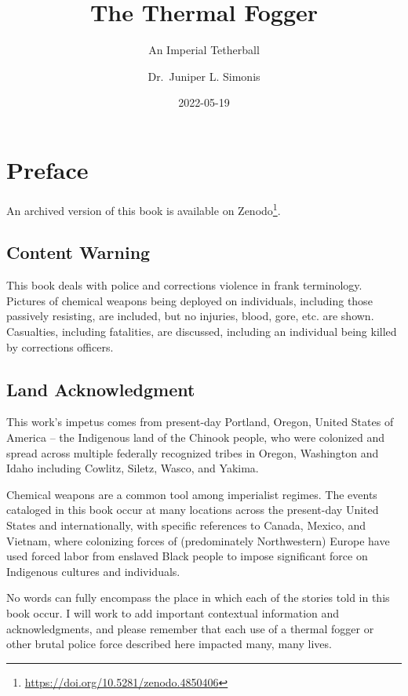 \documentclass[
  11pt,
]{krantz}
\title{The Thermal Fogger}
\subtitle{An Imperial Tetherball}
\author{Dr.~Juniper L. Simonis}
\date{2022-05-19}
\renewcommand{\href}[2]{#2\footnote{\url{#1}}}
\begin{document}
\maketitle



{
\hypersetup{linkcolor=}
\setcounter{tocdepth}{2}
\tableofcontents
}
\listoffigures
\hypertarget{preface}{%
\chapter*{Preface}\label{preface}}


\href{https://doi.org/10.5281/zenodo.4850406}{An archived version of this book is available on Zenodo}.

\hypertarget{content-warning}{%
\section*{Content Warning}\label{content-warning}}


This book deals with police and corrections violence in frank terminology.
Pictures of chemical weapons being deployed on individuals, including those passively resisting, are included, but no injuries, blood, gore, etc. are shown.
Casualties, including fatalities, are discussed, including an individual being killed by corrections officers.

\hypertarget{land-acknowledgment}{%
\section*{Land Acknowledgment}\label{land-acknowledgment}}


This work's impetus comes from present-day Portland, Oregon, United States of America -- the Indigenous land of the Chinook people, who were colonized and spread across multiple federally recognized tribes in Oregon, Washington and Idaho including Cowlitz, Siletz, Wasco, and Yakima.

Chemical weapons are a common tool among imperialist regimes.
The events cataloged in this book occur at many locations across the present-day United States and internationally, with specific references to Canada, Mexico, and Vietnam, where colonizing forces of (predominately Northwestern) Europe have used forced labor from enslaved Black people to impose significant force on Indigenous cultures and individuals.

No words can fully encompass the place in which each of the stories told in this book occur.
I will work to add important contextual information and acknowledgments, and please remember that each use of a thermal fogger or other brutal police force described here impacted many, many lives.
\end{document}
